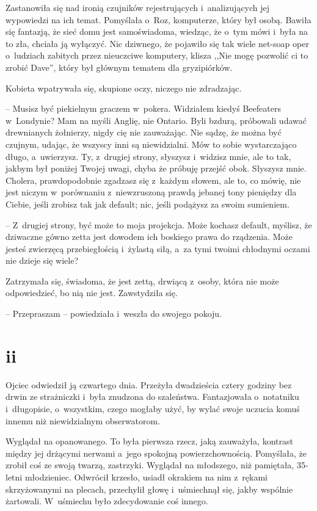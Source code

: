 \documentclass[oneside,polish,11pt,sfheadings]{mwbk}
\begin{document}
Zastanowiła się nad ironią czujników rejestrujących i~analizujących jej
wypowiedzi na ich temat. Pomyślała o~Roz, komputerze, który był osobą.
Bawiła się fantazją, że sieć domu jest samoświadoma, wiedząc, że o~tym
mówi i~była na to zła, chciała ją wyłączyć. Nic dziwnego, że pojawiło
się tak wiele net-soap oper o~ludziach zabitych przez nieuczciwe
komputery, klisza ,,Nie mogę pozwolić ci to zrobić Dave'', który był
głównym tematem dla gryzipiórków.

Kobieta wpatrywała się, skupione oczy, niczego nie zdradzając.

-- Musisz być piekielnym graczem w~pokera. Widziałem kiedyś Beefeaters w~Londynie? Mam na myśli Anglię, nie Ontario. Byli bzdurą, próbowali
udawać drewnianych żołnierzy, nigdy cię nie zauważając. Nie sądzę, że
można być czujnym, udając, że wszyscy inni są niewidzialni. Mów to sobie
wystarczająco długo, a~uwierzysz. Ty, z~drugiej strony, słyszysz i~widzisz mnie, ale to tak, jakbym był poniżej Twojej uwagi, chyba że
próbuję przejść obok. Słyszysz mnie. Cholera, prawdopodobnie zgadzasz
się z~każdym słowem, ale to, co mówię, nie jest niczym w~porównaniu z~niewzruszoną prawdą jebanej tony pieniędzy dla Ciebie, jeśli zrobisz tak
jak default; nic, jeśli podążysz za swoim sumieniem.

-- Z~drugiej strony, być może to moja projekcja. Może kochasz default,
myślisz, że dziwaczne gówno zetta jest dowodem ich boskiego prawa do
rządzenia. Może jesteś zwierzęcą przebiegłością i~żylastą siłą, a~za
tymi twoimi chłodnymi oczami nie dzieje się wiele?

Zatrzymała się, świadoma, że jest zettą, drwiącą z~osoby, która nie może
odpowiedzieć, bo nią nie jest. Zawstydziła się.

-- Przepraszam -- powiedziała i~weszła do swojego pokoju.
\chapter*{ii}

Ojciec odwiedził ją czwartego dnia. Przeżyła dwadzieścia cztery godziny
bez drwin ze strażniczki i~była znudzona do szaleństwa. Fantazjowała o~notatniku i~długopisie, o~wszystkim, czego mogłaby użyć, by wylać swoje
uczucia komuś innemu niż niewidzialnym obserwatorom.

Wyglądał na opanowanego. To była pierwsza rzecz, jaką zauważyła,
kontrast między jej drżącymi nerwami a~jego spokojną powierzchownością.
Pomyślała, że zrobił coś ze swoją twarzą, zastrzyki. Wyglądał na
młodszego, niż pamiętała, 35-letni młodzieniec. Odwrócił krzesło, usiadł
okrakiem na nim z~rękami skrzyżowanymi na plecach, przechylił głowę i~uśmiechnął się, jakby wspólnie żartowali. W~uśmiechu było zdecydowanie
coś innego.
\end{document}
